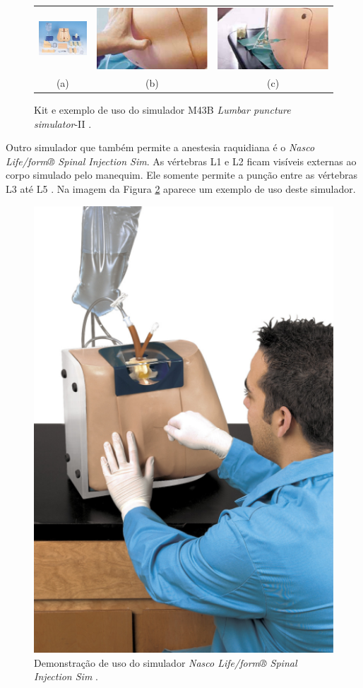 \begin{figure}[ht!]
    \centering
        \begin{tabular}{ccc}
        \includegraphics[width=0.3\linewidth]{capitulos/figuras/m43b-kit.jpg} & 
        \includegraphics[width=0.3\linewidth]{capitulos/figuras/m43b-usoPalpacao.jpg} 
        &
        \includegraphics[width=0.3\linewidth]{capitulos/figuras/m43b-usoAgulha.jpg} 
        \\
        (a) & (b) & (c)
        \end{tabular}
    \caption{Kit e exemplo de uso do simulador M43B \textit{Lumbar puncture simulator}-II \cite{KyotokagakuCo.2011}.}
    \label{fig:m43bSimulator}
\end{figure}

Outro simulador que também permite a anestesia raquidiana é o \textit{Nasco Life/form® Spinal Injection Sim}. As vértebras L1 e L2 ficam visíveis externas ao corpo simulado pelo manequim. Ele somente permite a punção entre as vértebras L3 até L5 \cite{Nasco2008}. Na imagem da Figura \ref{fig:nascoSimulator} aparece um exemplo de uso deste simulador.

\begin{figure}[ht!]
    \centering
    \includegraphics[width=0.3\linewidth]{capitulos/figuras/nascoSimulator.png} 
    \caption{Demonstração de uso do simulador \textit{Nasco Life/form® Spinal Injection Sim} \cite{Nasco2008}.}
    \label{fig:nascoSimulator}
\end{figure}

